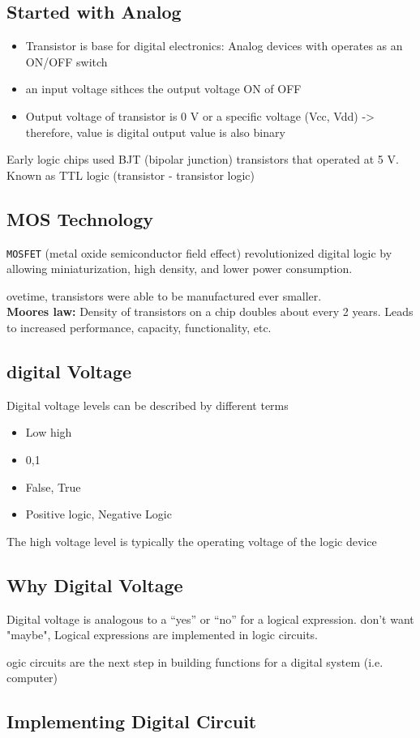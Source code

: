 \documentclass[a4paper, 12pt]{article}
\begin{document}
    \subsection*{Started with Analog}
    \begin{itemize}
        \item Transistor is base for digital electronics: Analog devices with operates
        as an ON/OFF switch
        \item an input voltage sithces the output voltage ON of OFF
        \item Output voltage of transistor is 0 V or a specific voltage (Vcc, Vdd) ->
    therefore, value is digital output value is also binary
    \end{itemize}
    Early logic chips used BJT (bipolar junction) transistors that operated at 5 V. Known as TTL logic (transistor - transistor logic)

    \subsection*{MOS Technology}
    \texttt{MOSFET} (metal oxide semiconductor field effect) revolutionized digital logic by
    allowing miniaturization, high density, and lower power consumption.
    \par ovetime, transistors were able to be manufactured ever smaller. \\ \textbf{Moores law:} 
    Density of transistors on a chip doubles about every 2 years. Leads to
    increased performance, capacity, functionality, etc.

    \subsection{digital Voltage}
    Digital voltage levels can be described by different terms
    \begin{itemize}
        \item Low high
        \item 0,1
        \item False, True
        \item Positive logic, Negative Logic
    \end{itemize}
    The high voltage  level is typically the operating voltage of the logic device

    \subsection*{Why Digital Voltage}
    Digital voltage is analogous to a “yes” or “no” for a logical expression. don't want "maybe",
     Logical expressions are implemented in logic circuits.
     \par ogic circuits are the next step in building functions for a digital system (i.e. computer)

     \subsection*{Implementing Digital Circuit}
\end{document}
